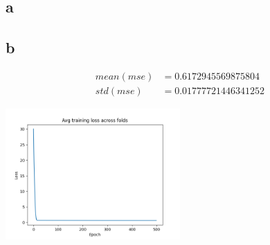 \documentclass[11pt]{article}
\begin{document}
\subsection{a}

\subsection{b}

\begin{align*}
    mean(mse) &= 0.6172945569875804 \\
    std(mse) &= 0.01777721446341252
\end{align*}

\includegraphics[width=0.5\textwidth]{cross_validation_results.png}
\end{document}
